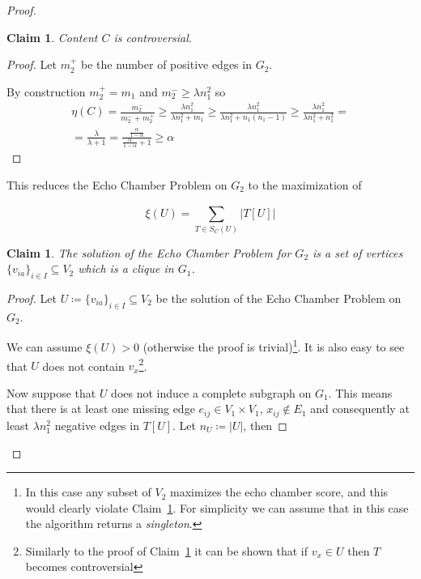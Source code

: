 \documentclass{article}
\newtheorem{claim}[theorem]{Claim}
\begin{document}
\begin{proof}
	\begin{claim}
		\label{th:claim-controversial}
		Content $C$ is controversial.
	\end{claim}
	\begin{proof}
		Let $m_{2}^{+} $ be the number of positive edges in $G_{2} $.

		By construction $m_{2}^{+} = m _{1} $ and $m_{2}^{-} \geq
			\lambda n_{1}^{2}  $ so
		\begin{align}
			\eta(C) = \frac{m_{2}^{-} }{m_{2}^{-} +
				m_{2}^{+} } \geq \frac{\lambda n_{1}^{2}}{\lambda n_{1}^{2}
				+ m_{1} } \geq \frac{\lambda n_{1}^{2}}{\lambda n_{1}^{2}
				+ n_{1}(n _{1} -1 )  } \geq \frac{\lambda n_{1}^{2}}{\lambda n_{1}^{2}
			+ n_{1}^{2} } = \\
			= \frac{\lambda }{\lambda + 1} =
			\frac{ \frac{\alpha }{1 - \alpha }  }{ \frac{\alpha }{1 - \alpha }
				+ 1 } \geq \alpha
		\end{align}
	\end{proof}

	This reduces the Echo Chamber Problem on $G_2$ to the maximization of

	\begin{equation}
		\label{eq:score}
		\xi(U) = \sum^{}_{T \in S_{C}(U) } | T[U] |
	\end{equation}

	\begin{claim}
		\label{th:claim-complete}
		The solution of the Echo Chamber Problem for $G_2$ is a set of vertices
		$\{ v_{ia} \} _{i \in I}  \subseteq V_{2} $ which is a clique
		in $G_{1} $.
	\end{claim}

	\begin{proof}
		Let $U \coloneqq \{ v_{ia} \} _{i \in I}  \subseteq V_{2} $ be the
		solution of the Echo Chamber Problem on $G_2$.

		We can assume $\xi(U) > 0$ (otherwise the proof is
		trivial)\footnote{In this case any subset of $V_{2} $ maximizes the echo
			chamber score, and this would clearly
			violate Claim~\ref{th:claim-complete}. For simplicity we can
			assume that in this case the algorithm returns a
			\emph{singleton}.}.
		It is also easy to see that $U$ does not contain $v_x$\footnote{Similarly
			to the proof of Claim~\ref{th:claim-controversial} it can be shown
			that if $v_x \in U$ then $T$ becomes controversial}.

		Now suppose that $U$ does not induce a complete subgraph on $G_1$. This
		means that there is at least one missing edge $e_{ij} \in V_1 \times
			V_1 $, $x_{ij} \not\in E_1$ and consequently at
		least $\lambda n^{2}_{1}  $ negative edges in $T[U]$. Let $n_U
			\coloneqq |U|$, then


\end{proof}
\end{proof}
\end{document}

